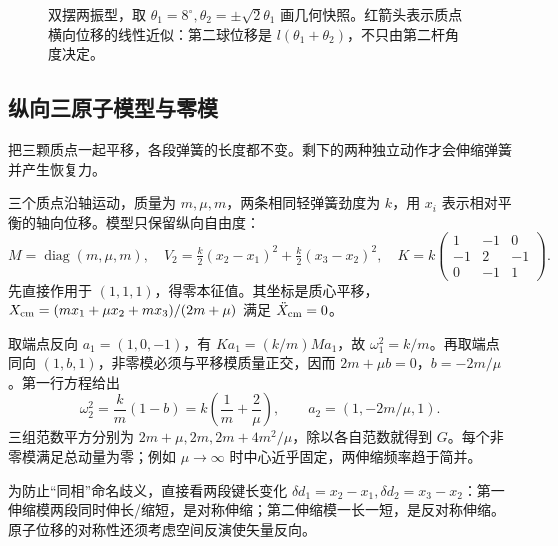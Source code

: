 \begin{figure}[htbp]
\centering
{}
\caption{双摆两振型，取 $\theta_1=8^\circ,\theta_2=\pm\sqrt2\theta_1$ 画几何快照。红箭头表示质点横向位移的线性近似：第二球位移是 $l(\theta_1+\theta_2)$，不只由第二杆角度决定。}
\label{fig:osc-double-modes}
\end{figure}

\subsection{纵向三原子模型与零模}
把三颗质点一起平移，各段弹簧的长度都不变。剩下的两种独立动作才会伸缩弹簧并产生恢复力。

\begin{example}[伸缩频率与质心分离]
三个质点沿轴运动，质量为 $m,\mu,m$，两条相同轻弹簧劲度为 $k$，用 $x_i$ 表示相对平衡的轴向位移。模型只保留纵向自由度：
\[
M=\operatorname{diag}(m,\mu,m),\quad
V_2=\tfrac k2(x_2-x_1)^2+\tfrac k2(x_3-x_2)^2,\quad
K=k\begin{pmatrix}1&-1&0\\-1&2&-1\\0&-1&1\end{pmatrix}.
\]
先直接作用于 $(1,1,1)$，得零本征值。其坐标是质心平移，$X_{\rm cm}=(mx_1+\mu x_2+mx_3)/(2m+\mu)$ 满足 $\ddot X_{\rm cm}=0$。

取端点反向 $a_1=(1,0,-1)$，有 $Ka_1=(k/m)Ma_1$，故 $\omega_1^2=k/m$。再取端点同向 $(1,b,1)$，非零模必须与平移模质量正交，因而 $2m+\mu b=0$，$b=-2m/\mu$。第一行方程给出
\[
\omega_2^2=\frac{k}{m}(1-b)=k\left(\frac1m+\frac2\mu\right),\qquad
 a_2=(1,-2m/\mu,1).
\]
三组范数平方分别为 $2m+\mu,2m,2m+4m^2/\mu$，除以各自范数就得到 $G$。每个非零模满足总动量为零；例如 $\mu\to\infty$ 时中心近乎固定，两伸缩频率趋于简并。

为防止“同相”命名歧义，直接看两段键长变化 $\delta d_1=x_2-x_1,\delta d_2=x_3-x_2$：第一伸缩模两段同时伸长/缩短，是对称伸缩；第二伸缩模一长一短，是反对称伸缩。原子位移的对称性还须考虑空间反演使矢量反向。
\end{example}

